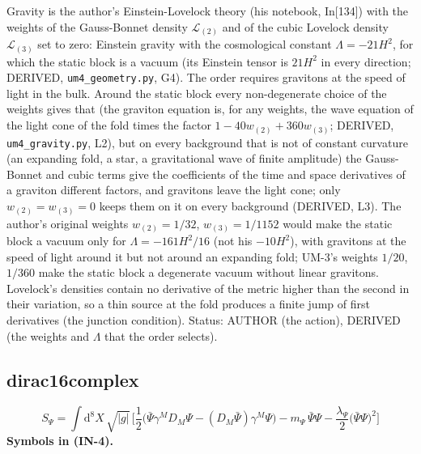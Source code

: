 \documentclass[
  10pt,
]{article}
\begin{document}
Gravity is the author's Einstein-Lovelock theory (his notebook,
In{[}134{]}) with the weights of the Gauss-Bonnet density
\(\mathcal{L}_{(2)}\) and of the cubic Lovelock density
\(\mathcal{L}_{(3)}\) set to zero: Einstein gravity with the
cosmological constant \(\Lambda = -21H^2\), for which the static block
is a vacuum (its Einstein tensor is \(21H^2\) in every direction;
DERIVED, \texttt{um4\_geometry.py}, G4). The order requires gravitons at
the speed of light in the bulk. Around the static block every
non-degenerate choice of the weights gives that (the graviton equation
is, for any weights, the wave equation of the light cone of the fold
times the factor \(1 - 40w_{(2)} + 360w_{(3)}\); DERIVED,
\texttt{um4\_gravity.py}, L2), but on every background that is not of
constant curvature (an expanding fold, a star, a gravitational wave of
finite amplitude) the Gauss-Bonnet and cubic terms give the coefficients
of the time and space derivatives of a graviton different factors, and
gravitons leave the light cone; only \(w_{(2)} = w_{(3)} = 0\) keeps
them on it on every background (DERIVED, L3). The author's original
weights \(w_{(2)} = 1/32\), \(w_{(3)} = 1/1152\) would make the static
block a vacuum only for \(\Lambda = -161H^2/16\) (not his \(-10H^2\)),
with gravitons at the speed of light around it but not around an
expanding fold; UM-3's weights \(1/20\), \(1/360\) make the static block
a degenerate vacuum without linear gravitons. Lovelock's densities
contain no derivative of the metric higher than the second in their
variation, so a thin source at the fold produces a finite jump of first
derivatives (the junction condition). Status: AUTHOR (the action),
DERIVED (the weights and \(\Lambda\) that the order selects).

\hypertarget{dirac16complex}{%
\subsection{dirac16complex}\label{dirac16complex}}

\[
S_\Psi = \int\mathrm{d}^8X\,\sqrt{\lvert g\rvert}\,\Big[\frac12\big(\bar\Psi\gamma^MD_M\Psi - (D_M\bar\Psi)\gamma^M\Psi\big)
 - m_\Psi\,\bar\Psi\Psi - \frac{\lambda_\Psi}{2}\big(\bar\Psi\Psi\big)^2\Big] \tag{IN-4}
\] \textbf{Symbols in (IN-4).}
\end{document}
